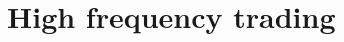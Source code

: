 \documentclass[xcolor={x11names,svgnames,dvipsnames}]{beamer}
\begin{document}
\section{High frequency trading}
\begin{frame}

%
%
%
%
%
%
%

\end{frame}
\end{document}
